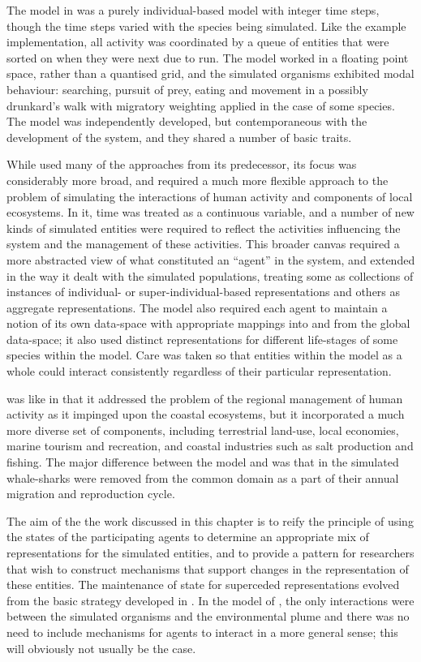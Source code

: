 The model in \cite{lyne1994pmez5} was a purely individual-based model
with integer time steps, though the time steps varied with the species
being simulated. Like the example implementation, all activity was coordinated
by a queue of entities that were sorted on when they were next due to
run. The model worked in a floating point space, rather than a
quantised grid, and the simulated organisms exhibited modal behaviour:
searching, pursuit of prey, eating and movement in a possibly
drunkard's walk with migratory weighting applied in the case of some
species.  The model was independently developed, but contemporaneous
with the development of the  system\citep{swarm}, and
they shared a number of basic traits.

While \cite{gray2006nws} used many of the approaches from its
predecessor, its focus was considerably more broad, and required a
much more flexible approach to the problem of simulating the
interactions of human activity and components of local ecosystems. In
it, time was treated as a continuous variable, and a number of
new kinds of simulated entities were required to reflect the
activities influencing the system and the management of these
activities. This broader canvas required a more abstracted view of
what constituted an ``agent'' in the system, and extended
\cite{lyne1994pmez5} in the way it dealt with the simulated
populations, treating some as collections of instances of individual-
or super-individual-based representations and others as aggregate
representations.  The model also required each agent to maintain a
notion of its own data-space with appropriate mappings into and from
the global data-space; it also used distinct representations for
different life-stages of some species within the model.  Care was
taken so that entities within the model as a whole could interact
consistently regardless of their particular representation.

\cite{gray2014} was like \cite{gray2006nws} in that it addressed the
problem of the regional management of human activity as it impinged
upon the coastal ecosystems, but it incorporated a much more diverse
set of components, including terrestrial land-use, local economies,
marine tourism and recreation, and coastal industries such as salt
production and fishing. The major difference between the model and
\cite{gray2006nws} was that in \cite{gray2014} the simulated 
whale-sharks were removed from the common domain as a part of their
annual migration and reproduction cycle.

The aim of the the work discussed in this chapter is to reify the
principle of using the states of the participating agents to determine
an appropriate mix of representations for the simulated entities, and
to provide a pattern for researchers that wish to construct mechanisms
that support changes in the representation of these entities. The
maintenance of state for superceded representations evolved from the
basic strategy developed in \Ctwo.  In the model of \Ctwo, the only
interactions were between the simulated organisms and the
environmental plume and there was no need to include mechanisms for
agents to interact in a more general sense; this will obviously not
usually be the case.

